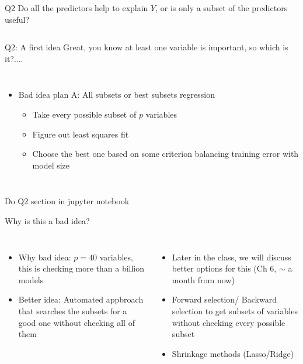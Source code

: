 \documentclass[aspectratio=169,usenames,dvipsnames]{beamer}
\newcommand{\InstructorList}[1]{
\begin{itemize}
	\color{orange}
	#1
\end{itemize}
}
\begin{document}
\begin{frame}

\begin{columns}
\centering
\begin{block}
	{Q2}
Do all the predictors help to explain $Y$, or is only a subset of the predictors useful?
\end{block}

\end{columns}

\end{frame}
\begin{frame}[t]{Q2: A first idea}
{Great, you know at least one variable is important, so which is it?....}
\begin{columns}
\centering
\InstructorList{
\item Bad idea plan A: All subsets or best subsets regression
	\InstructorList{
		\item Take every possible subset of $p$ variables
		\item Figure out least squares fit
		\item Choose the best one based on some criterion balancing training error with model size
	}
}
\centering
\end{columns}

\end{frame}
{
\begin{frame}[c]{}

	\centering 
	Do Q2 section in jupyter notebook 

\end{frame}
}

\begin{frame}[t]{Why is this a bad idea?}
\begin{columns}
\centering
\InstructorList{
\item Why bad idea: $p=40$ variables, this is checking more than a billion models
\item Better idea: Automated appbroach that searches the subsets for a good one without checking all of them
}
\centering
\InstructorList{
  \item Later in the class, we will discuss better options for this (Ch 6, $\sim$ a month from now)
  \item Forward selection/ Backward selection to get subsets of variables without checking every possible subset 
  \item Shrinkage methods (Lasso/Ridge)
}

\end{columns}
\end{frame}
\end{document}
